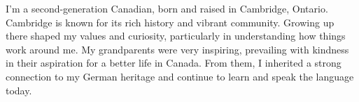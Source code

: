 
I’m a second-generation Canadian, born and raised in Cambridge, Ontario. Cambridge is known for its rich history and vibrant community. Growing up there shaped my values and curiosity, particularly in understanding how things work around me. My grandparents were very inspiring, prevailing with kindness in their aspiration for a better life in Canada. From them, I inherited a strong connection to my German heritage and continue to learn and speak the language today.
